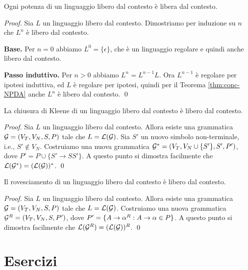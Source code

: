 \documentclass[runningheads,a4paper]{llncs}
\begin{document}
\begin{theorem}[Potenza]\label{thm:pot-NPDA}
Ogni potenza di un linguaggio libero dal contesto \`{e} libera dal contesto.
\end{theorem}

\begin{proof}
Sia $L$ un linguaggio libero dal contesto. Dimostriamo per induzione su $n$ che $L^n$ \`{e} libero dal contesto. 

\noindent\textbf{Base.} Per $n=0$ abbiamo $L^0 = \{\epsilon\}$, che \`{e} un linguaggio regolare e quindi anche libero dal contesto.

\noindent\textbf{Passo induttivo.} Per $n > 0$ abbiamo $L^n = L^{n-1}L$. Ora $L^{n-1}$ \`{e} regolare per ipotesi induttiva, ed $L$ \`{e} regolare per ipotesi, quindi per il Teorema \ref{thm:conc-NPDA} anche $L^n$ \`{e} libero dal contesto.
\qed\end{proof}

\begin{theorem}\label{thm:Kleene-NPDA}
La chiusura di Kleene di un linguaggio libero dal contesto \`{e} libero dal contesto.
\end{theorem}

\begin{proof}
Sia $L$ un linguaggio libero dal contesto. Allora esiste una grammatica $\mathcal{G} = (V_T, V_N, S,P)$ tale che $L = \mathcal{L}(\mathcal{G})$. Sia $S'$ un nuovo simbolo non-terminale, i.e., $S' \not\in V_N$. Costruiamo una nuova grammatica $\mathcal{G}^* = (V_T,V_N \cup \{S'\}, S', P')$, dove $P' = P \cup \{S' \to SS'\}$. A questo punto si dimostra facilmente che $\mathcal{L}(\mathcal{G}^*) = (\mathcal{L}(\mathcal{G}))^*$.
\qed\end{proof}

\begin{theorem}[Rovesciamento]\label{thm:rovesc-NPDA}
Il rovesciamento di un linguaggio libero dal contesto \`{e} libero dal contesto.
\end{theorem}

\begin{proof}
Sia $L$ un linguaggio libero dal contesto. Allora esiste una grammatica $\mathcal{G} = (V_T, V_N, S,P)$ tale che $L = \mathcal{L}(\mathcal{G})$. Costruiamo una nuova grammatica $\mathcal{G}^R = (V_T,V_N, S, P')$, dove $P' = \{A \to \alpha^R : A \to \alpha \in P\}$. A questo punto si dimostra facilmente che $\mathcal{L}(\mathcal{G}^R) = (\mathcal{L}(\mathcal{G}))^R$.
\qed\end{proof}

\section{Esercizi}
\end{document}
